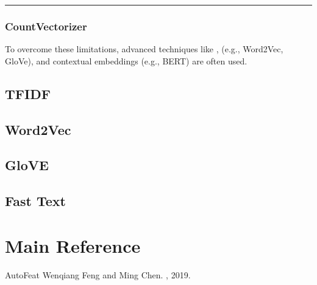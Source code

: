 \documentclass[letterpaper,11pt,english]{sphinxmanual}
\begin{document}
\bigskip\hrule\bigskip



\subsection{CountVectorizer}
\label{\detokenize{embedding:countvectorizer}}
\sphinxAtStartPar
To overcome these limitations, advanced techniques like ,  (e.g., Word2Vec, GloVe), and contextual embeddings (e.g., BERT) are often used.


\section{TF\sphinxhyphen{}IDF}
\label{\detokenize{embedding:tf-idf}}

\section{Word2Vec}
\label{\detokenize{embedding:word2vec}}

\section{GloVE}
\label{\detokenize{embedding:glove}}

\section{Fast Text}
\label{\detokenize{embedding:fast-text}}
\sphinxstepscope


\chapter{Main Reference}
\label{\detokenize{reference:main-reference}}\label{\detokenize{reference:reference}}\label{\detokenize{reference::doc}}
\begin{sphinxthebibliography}{AutoFeat}
\sphinxAtStartPar
Wenqiang Feng and Ming Chen.
, 2019.
\end{sphinxthebibliography}



\renewcommand{\indexname}{Index}
\printindex
\end{document}
